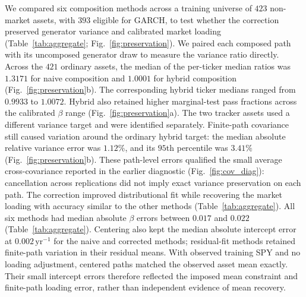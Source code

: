 We compared six composition methods across a training universe of
$423$ non-market assets, with $393$ eligible for GARCH, to test
whether the correction preserved generator variance and
calibrated market loading (Table~\ref{tab:aggregate};
Fig.~\ref{fig:preservation}). We paired each composed path with its
uncomposed generator draw to measure the variance ratio directly.
Across the $421$ ordinary assets, the median of the per-ticker
median ratios was $1.3171$ for naive composition and $1.0001$ for
hybrid composition (Fig.~\ref{fig:preservation}b). The corresponding
hybrid ticker medians ranged from $0.9933$ to $1.0072$. Hybrid also
retained higher marginal-test pass fractions across the calibrated
$\beta$ range (Fig.~\ref{fig:preservation}a). The two tracker assets
used a different variance target and were identified separately.
Finite-path covariance still caused variation around the ordinary
hybrid target: the median absolute relative variance error was
$1.12\%$, and its $95$th percentile was $3.41\%$
(Fig.~\ref{fig:preservation}b). These path-level errors qualified the
small average cross-covariance reported in the earlier diagnostic
(Fig.~\ref{fig:cov_diag}): cancellation across replications did not imply
exact variance preservation on each path.
The correction improved distributional fit while recovering the
market loading with accuracy similar to the other methods
(Table~\ref{tab:aggregate}).
All six methods had median absolute $\beta$ errors between $0.017$
and $0.022$ (Table~\ref{tab:aggregate}). Centering also kept the
median absolute intercept error at $0.002\,\mathrm{yr}^{-1}$ for
the naive and corrected methods; residual-fit methods retained
finite-path variation in their residual means. With observed training
SPY and no loading adjustment, centered paths matched the observed
asset mean exactly. Their small intercept errors therefore reflected
the imposed mean constraint and finite-path loading error, rather
than independent evidence of mean recovery.



